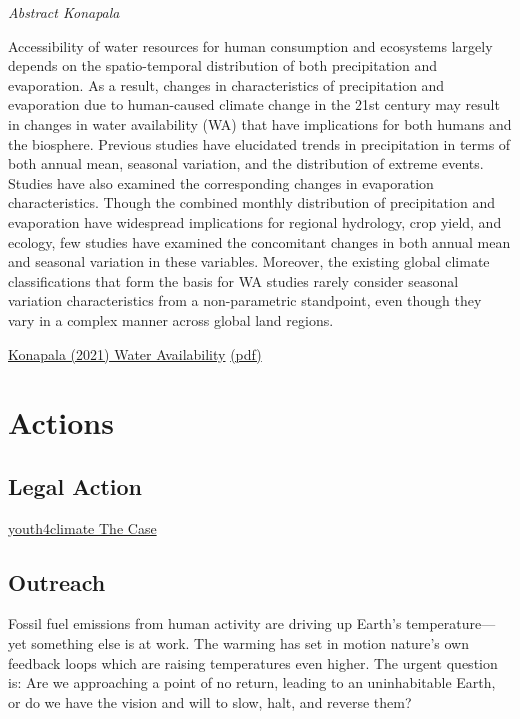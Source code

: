 \documentclass[
]{book}
\begin{document}
\emph{Abstract Konapala}

Accessibility of water resources for human consumption and ecosystems largely depends on the spatio-temporal distribution of both precipitation and evaporation.
As a result, changes in characteristics of precipitation and evaporation due to human-caused climate change in the 21st century may result in changes in water availability (WA) that have implications for both humans and the biosphere.
Previous studies have elucidated trends in precipitation in terms of both annual mean, seasonal variation, and the distribution of extreme events. Studies have also examined the corresponding changes in evaporation characteristics.
Though the combined monthly distribution of precipitation and evaporation have widespread implications for regional hydrology, crop yield, and ecology, few studies have examined the concomitant changes in both annual mean and seasonal variation in these variables.
Moreover, the existing global climate classifications that form the basis for WA studies rarely consider seasonal variation characteristics from a non-parametric standpoint, even though they vary in a complex manner across global land regions.

\href{https://www.nature.com/articles/s41467-020-16757-w}{Konapala (2021) Water Availability}
\href{pdf/Konapala_2021_Water_Availability.pdf}{(pdf)}

\hypertarget{part-actions}{%
\part{Actions}\label{part-actions}}

\hypertarget{legal-action}{%
\chapter{Legal Action}\label{legal-action}}

\href{https://youth4climatejustice.org/the-case/}{youth4climate The Case}

\hypertarget{outreach}{%
\chapter{Outreach}\label{outreach}}

Fossil fuel emissions from human activity are driving up Earth's temperature---
yet something else is at work.
The warming has set in motion nature's own feedback loops
which are raising temperatures even higher.
The urgent question is:
Are we approaching a point of no return, leading to an uninhabitable Earth,
or do we have the vision and will to slow, halt, and reverse them?
\end{document}

